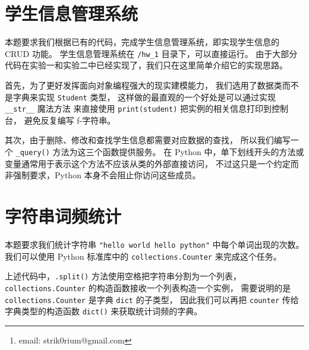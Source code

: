 \documentclass[openany, 10pt]{ctexart}
\title{\thetitle}
\author{Strik0r
\thanks{email: strik0rium@gmail.com}}
\begin{document}


\newpage
{\small \setlength{\parskip}{0em} \tableofcontents}

\section{学生信息管理系统}

    本题要求我们根据已有的代码，完成学生信息管理系统，即实现学生信息的 CRUD 功能。
    学生信息管理系统在 \lstinline|/hw_1| 目录下，可以直接运行。
    由于大部分代码在实验一和实验二中已经实现了，我们只在这里简单介绍它的实现思路。

    首先，为了更好发挥面向对象编程强大的现实建模能力，
    我们选用了数据类而不是字典来实现 \lstinline|Student| 类型，
    这样做的最直观的一个好处是可以通过实现 \lstinline|__str__| 魔法方法
    来直接使用 \lstinline|print(student)| 把实例的相关信息打印到控制台，
    避免反复编写 f-字符串。

    其次，由于删除、修改和查找学生信息都需要对应数据的查找，
    所以我们编写一个 \lstinline|_query()| 方法为这三个函数提供服务。
    在 Python 中，单下划线开头的方法或变量通常用于表示这个方法不应该从类的外部直接访问，
    不过这只是一个约定而非强制要求，Python 本身不会阻止你访问这些成员。

\section{字符串词频统计}
    
    本题要求我们统计字符串 \lstinline|"hello world hello python"| 中每个单词出现的次数。
    我们可以使用 Python 标准库中的 \lstinline|collections.Counter| 来完成这个任务。
    

    上述代码中，\lstinline|.split()| 方法使用空格把字符串分割为一个列表，
    \lstinline|collections.Counter| 的构造函数接收一个列表构造一个实例，
    需要说明的是 \lstinline|collections.Counter| 是字典 \lstinline|dict| 的子类型，
    因此我们可以再把 \lstinline|counter| 传给字典类型的构造函数 \lstinline|dict()| 来获取统计词频的字典。
\end{document}
